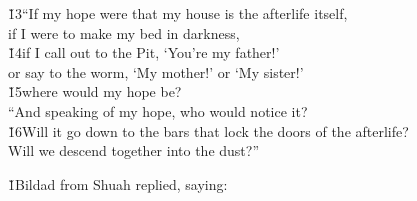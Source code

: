 \begin{poetry}
\poeml \v{13}``If my hope were that my house is the afterlife itself, \\
\poemll    if I were to make my bed in darkness, \\
\poeml \v{14}if I call out to the Pit, `You're my father!' \\
\poemll    or say to the worm, `My mother!' or `My sister!' \\
\poeml \v{15}where would my hope be? \\
\poeml ``And speaking of my hope, who would notice it? \\
\poeml \v{16}Will it go down to the bars that lock the doors of the afterlife? \\
\poemlll       Will we descend together into the dust?''
\end{poetry}

\v{1}Bildad from Shuah replied, saying:

